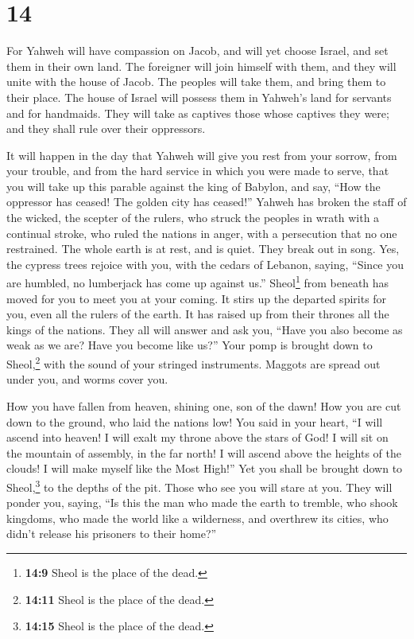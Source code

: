 \hypertarget{section-13}{%
\section{14}\label{section-13}}

 For Yahweh will have compassion on Jacob, and will yet
choose Israel, and set them in their own land. The foreigner will join
himself with them, and they will unite with the house of Jacob.
 The peoples will take them, and bring them to their
place. The house of Israel will possess them in Yahweh's land for
servants and for handmaids. They will take as captives those whose
captives they were; and they shall rule over their oppressors.

 It will happen in the day that Yahweh will give you rest
from your sorrow, from your trouble, and from the hard service in which
you were made to serve,  that you will take up this
parable against the king of Babylon, and say, ``How the oppressor has
ceased! The golden city has ceased!''  Yahweh has broken
the staff of the wicked, the scepter of the rulers,  who
struck the peoples in wrath with a continual stroke, who ruled the
nations in anger, with a persecution that no one restrained.
 The whole earth is at rest, and is quiet. They break out
in song.  Yes, the cypress trees rejoice with you, with
the cedars of Lebanon, saying, ``Since you are humbled, no lumberjack
has come up against us.''  Sheol\footnote{\textbf{14:9}
  Sheol is the place of the dead.} from beneath has moved for you to
meet you at your coming. It stirs up the departed spirits for you, even
all the rulers of the earth. It has raised up from their thrones all the
kings of the nations.  They all will answer and ask you,
``Have you also become as weak as we are? Have you become like us?''
 Your pomp is brought down to Sheol,\footnote{\textbf{14:11}
  Sheol is the place of the dead.} with the sound of your stringed
instruments. Maggots are spread out under you, and worms cover you.

 How you have fallen from heaven, shining one, son of the
dawn! How you are cut down to the ground, who laid the nations low!
 You said in your heart, ``I will ascend into heaven! I
will exalt my throne above the stars of God! I will sit on the mountain
of assembly, in the far north!  I will ascend above the
heights of the clouds! I will make myself like the Most High!''
 Yet you shall be brought down to Sheol,\footnote{\textbf{14:15}
  Sheol is the place of the dead.} to the depths of the pit.
 Those who see you will stare at you. They will ponder
you, saying, ``Is this the man who made the earth to tremble, who shook
kingdoms,  who made the world like a wilderness, and
overthrew its cities, who didn't release his prisoners to their home?''

